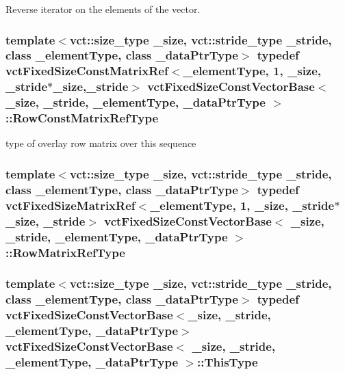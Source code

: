 Reverse iterator on the elements of the vector. \hypertarget{classvct_fixed_size_const_vector_base_ab7c118dbf79db9194157ced0e4549814}{
\subsubsection[{Row\-Const\-Matrix\-Ref\-Type}]{\setlength{\rightskip}{0pt plus 5cm}template$<$vct\-::size\-\_\-type \-\_\-size, vct\-::stride\-\_\-type \-\_\-stride, class \-\_\-element\-Type, class \-\_\-data\-Ptr\-Type$>$ typedef {\bf vct\-Fixed\-Size\-Const\-Matrix\-Ref}$<$\-\_\-element\-Type, 1, \-\_\-size, \-\_\-stride$\ast$\-\_\-size,\-\_\-stride$>$ {\bf vct\-Fixed\-Size\-Const\-Vector\-Base}$<$ \-\_\-size, \-\_\-stride, \-\_\-element\-Type, \-\_\-data\-Ptr\-Type $>$\-::{\bf Row\-Const\-Matrix\-Ref\-Type}}}\label{classvct_fixed_size_const_vector_base_ab7c118dbf79db9194157ced0e4549814}
type of overlay row matrix over this sequence \hypertarget{classvct_fixed_size_const_vector_base_a1f9ff7c6b2b3f98c51d1bf3eefdfbd32}{
\subsubsection[{Row\-Matrix\-Ref\-Type}]{\setlength{\rightskip}{0pt plus 5cm}template$<$vct\-::size\-\_\-type \-\_\-size, vct\-::stride\-\_\-type \-\_\-stride, class \-\_\-element\-Type, class \-\_\-data\-Ptr\-Type$>$ typedef {\bf vct\-Fixed\-Size\-Matrix\-Ref}$<$\-\_\-element\-Type, 1, \-\_\-size, \-\_\-stride$\ast$\-\_\-size, \-\_\-stride$>$ {\bf vct\-Fixed\-Size\-Const\-Vector\-Base}$<$ \-\_\-size, \-\_\-stride, \-\_\-element\-Type, \-\_\-data\-Ptr\-Type $>$\-::{\bf Row\-Matrix\-Ref\-Type}}}\label{classvct_fixed_size_const_vector_base_a1f9ff7c6b2b3f98c51d1bf3eefdfbd32}
\hypertarget{classvct_fixed_size_const_vector_base_a071063bc4fa43112cc287b2dbef53180}{
\subsubsection[{This\-Type}]{\setlength{\rightskip}{0pt plus 5cm}template$<$vct\-::size\-\_\-type \-\_\-size, vct\-::stride\-\_\-type \-\_\-stride, class \-\_\-element\-Type, class \-\_\-data\-Ptr\-Type$>$ typedef {\bf vct\-Fixed\-Size\-Const\-Vector\-Base}$<$\-\_\-size, \-\_\-stride, \-\_\-element\-Type, \-\_\-data\-Ptr\-Type$>$ {\bf vct\-Fixed\-Size\-Const\-Vector\-Base}$<$ \-\_\-size, \-\_\-stride, \-\_\-element\-Type, \-\_\-data\-Ptr\-Type $>$\-::{\bf This\-Type}}}\label{classvct_fixed_size_const_vector_base_a071063bc4fa43112cc287b2dbef53180}
